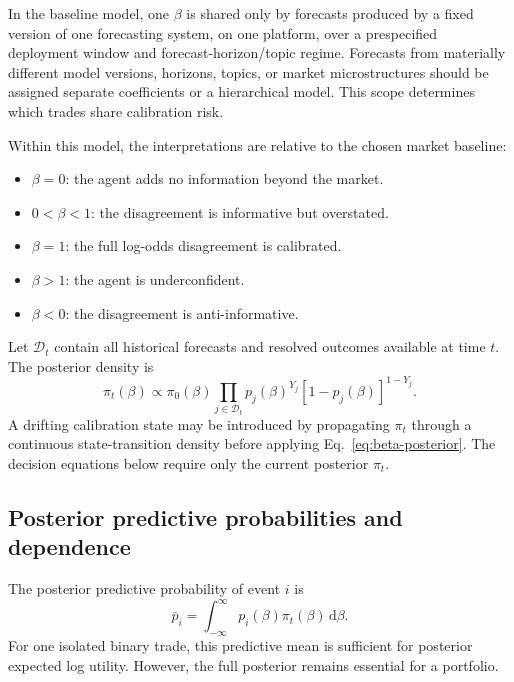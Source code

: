 \documentclass[journal, a4paper]{IEEEtran}
\begin{document}
In the baseline model, one $\beta$ is shared only by forecasts produced by a fixed version of one forecasting system, on one platform, over a prespecified deployment window and forecast-horizon/topic regime. Forecasts from materially different model versions, horizons, topics, or market microstructures should be assigned separate coefficients or a hierarchical model. This scope determines which trades share calibration risk.

Within this model, the interpretations are relative to the chosen market baseline:
\begin{itemize}
    \item $\beta=0$: the agent adds no information beyond the market.
    \item $0<\beta<1$: the disagreement is informative but overstated.
    \item $\beta=1$: the full log-odds disagreement is calibrated.
    \item $\beta>1$: the agent is underconfident.
    \item $\beta<0$: the disagreement is anti-informative.
\end{itemize}

Let $\mathcal{D}_t$ contain all historical forecasts and resolved outcomes available at time $t$. The posterior density is
\begin{equation}
\pi_t(\beta)
\propto
\pi_0(\beta)
\prod_{j\in\mathcal{D}_t}
 p_j(\beta)^{Y_j}
 [1-p_j(\beta)]^{1-Y_j}.
\label{eq:beta-posterior}
\end{equation}
A drifting calibration state may be introduced by propagating $\pi_t$ through a continuous state-transition density before applying Eq.~\eqref{eq:beta-posterior}. The decision equations below require only the current posterior $\pi_t$.

\subsection{Posterior predictive probabilities and dependence}
The posterior predictive probability of event $i$ is
\begin{equation}
\bar p_i
=
\int_{-\infty}^{\infty}p_i(\beta)\pi_t(\beta)\,\mathrm{d}\beta.
\label{eq:predictive-mean}
\end{equation}
For one isolated binary trade, this predictive mean is sufficient for posterior expected log utility. However, the full posterior remains essential for a portfolio.
\end{document}
